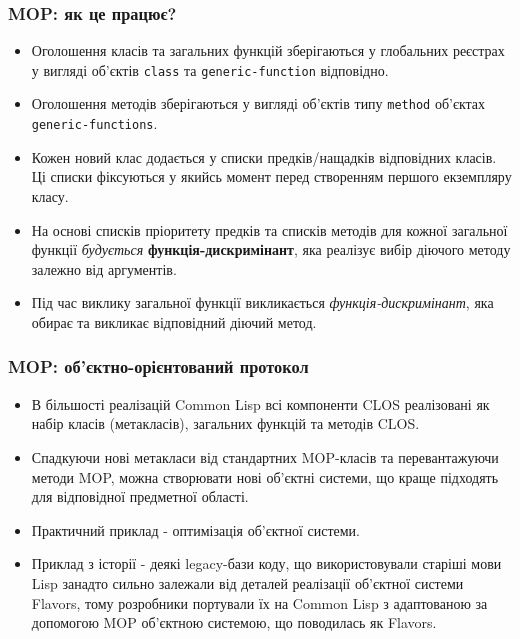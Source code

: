 \documentclass{beamer}
\begin{document}
\begin{frame}[fragile]
  \frametitle{MOP: як це працює?}
  \begin{itemize}
  \item Оголошення класів та загальних функцій зберігаються у глобальних
    реєстрах у вигляді об'єктів \texttt{class} та \texttt{generic-function}
    відповідно.
  \item Оголошення методів зберігаються у вигляді об'єктів типу \texttt{method}
    об'єктах \texttt{generic-functions}.
  \item Кожен новий клас додається у списки предків/нащадків відповідних
    класів. Ці списки фіксуються у якийсь момент перед створенням першого
    екземпляру класу.
  \item На основі списків пріоритету предків та списків методів для кожної
    загальної функції \textit{будується} \textbf{функція-дискримінант}, яка
    реалізує вибір діючого методу залежно від аргументів.
  \item Під час виклику загальної функції викликається
    \textit{функція-дискримінант}, яка обирає та викликає відповідний діючий
    метод.
  \end{itemize}
\end{frame}

\begin{frame}[fragile]
  \frametitle{MOP: об'єктно-орієнтований протокол}
  \begin{itemize}
  \item В більшості реалізацій Common Lisp всі компоненти CLOS реалізовані як
    набір класів (метакласів), загальних функцій та методів CLOS.
  \item Спадкуючи нові метакласи від стандартних MOP-класів та перевантажуючи
    методи MOP, можна створювати нові об'єктні системи, що краще підходять для
    відповідної предметної області.
  \item Практичний приклад - оптимізація об'єктної системи.
  \item Приклад з історії - деякі legacy-бази коду, що використовували старіші
    мови Lisp занадто сильно залежали від деталей реалізації об'єктної системи
    Flavors, тому розробники портували їх на Common Lisp з адаптованою за
    допомогою MOP об'єктною системою, що поводилась як Flavors.
  \end{itemize}
\end{frame}
\end{document}
